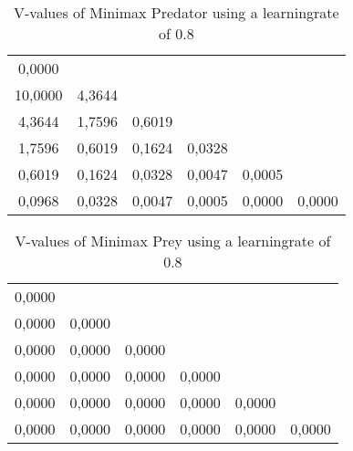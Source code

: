\begin{table}[htb]
\centering
\begin{tabular}{cccccc}
0,0000 &  &  &  &  & \\
10,0000 & 4,3644 &  &  &  & \\ 
4,3644 & 1,7596 & 0,6019 &  &  & \\
1,7596 & 0,6019 & 0,1624 & 0,0328 &  & \\ 
0,6019 & 0,1624 & 0,0328 & 0,0047 & 0,0005 & \\ 
0,0968 & 0,0328 & 0,0047 & 0,0005 & 0,0000 & 0,0000\\ 
\end{tabular}
\caption{V-values of Minimax Predator using a learningrate of 0.8}
\label{tab:predM}
\end{table}

\begin{table}[htb]
\centering
\begin{tabular}{cccccc}
0,0000 &  &  &  &  & \\ 
0,0000 & 0,0000 &  &  &  & \\ 
0,0000 & 0,0000 & 0,0000 &  &  & \\ 
0,0000 & 0,0000 & 0,0000 & 0,0000 &  & \\ 
0,0000 & 0,0000 & 0,0000 & 0,0000 & 0,0000 & \\ 
0,0000 & 0,0000 & 0,0000 & 0,0000 & 0,0000 & 0,0000\\ 
\end{tabular}
\caption{V-values of Minimax Prey using a learningrate of 0.8}
\label{tab:preyM}
\end{table}

\FloatBarrier
